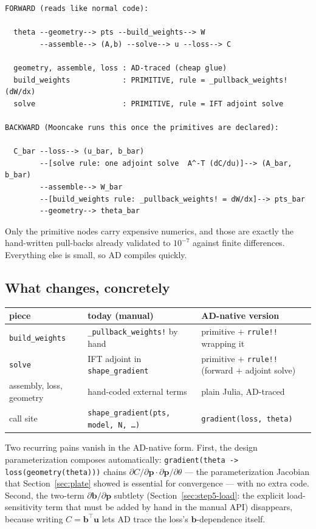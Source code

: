 \documentclass[11pt,a4paper]{article}
\newcommand{\vect}[1]{\boldsymbol{#1}}
\newcommand{\pts}{\vect{p}}
\begin{document}
\begin{footnotesize}
\begin{verbatim}
FORWARD (reads like normal code):

  theta --geometry--> pts --build_weights--> W
        --assemble--> (A,b) --solve--> u --loss--> C

  geometry, assemble, loss : AD-traced (cheap glue)
  build_weights            : PRIMITIVE, rule = _pullback_weights!  (dW/dx)
  solve                    : PRIMITIVE, rule = IFT adjoint solve

BACKWARD (Mooncake runs this once the primitives are declared):

  C_bar --loss--> (u_bar, b_bar)
        --[solve rule: one adjoint solve  A^-T (dC/du)]--> (A_bar, b_bar)
        --assemble--> W_bar
        --[build_weights rule: _pullback_weights! = dW/dx]--> pts_bar
        --geometry--> theta_bar
\end{verbatim}
\end{footnotesize}

Only the primitive nodes carry expensive numerics, and those are exactly the
hand-written pull-backs already validated to $10^{-7}$ against finite differences.
Everything else is small, so AD compiles quickly.

\subsection{What changes, concretely}

\begin{center}
\begin{tabular}{lll}
\hline
piece & today (manual) & AD-native version \\
\hline
\texttt{build\_weights} & \texttt{\_pullback\_weights!} by hand & primitive $+$ \texttt{rrule!!} wrapping it \\
\texttt{solve} & IFT adjoint in \texttt{shape\_gradient} & primitive $+$ \texttt{rrule!!} (forward $+$ adjoint solve) \\
assembly, loss, geometry & hand-coded external terms & plain Julia, AD-traced \\
call site & \texttt{shape\_gradient(pts, model, N, \ldots)} & \texttt{gradient(loss, theta)} \\
\hline
\end{tabular}
\end{center}

Two recurring pains vanish in the AD-native form. First, the design parameterization
composes automatically: \texttt{gradient(theta -> loss(geometry(theta)))} chains
$\partial C/\partial\pts \cdot \partial\pts/\partial\theta$ --- the parameterization
Jacobian that Section~\ref{sec:plate} showed is essential for convergence --- with no
extra code. Second, the two-term $\partial\vect b/\partial\pts$ subtlety
(Section~\ref{sec:step5-load}: the explicit load-sensitivity term that must be added
by hand in the manual API) disappears, because writing $C=\vect b^\top\vect u$ lets
AD trace the loss's $\vect b$-dependence itself.
\end{document}
